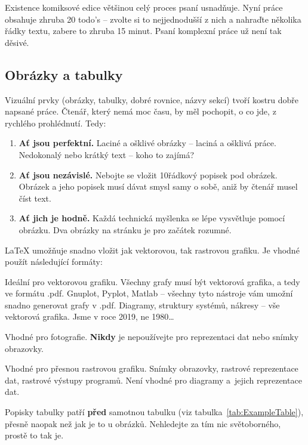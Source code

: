 Existence komiksové edice většinou celý proces psaní usnadňuje. Nyní práce obsahuje zhruba 20 todo's -- zvolte si to nejjednodušší z nich a nahraďte několika řádky textu, zabere to zhruba 15 minut. Psaní komplexní práce už není tak děsivé.

\subsection{Obrázky a tabulky}
\label{sec:Images}

Vizuální prvky (obrázky, tabulky, dobré rovnice, názvy sekcí) tvoří kostru dobře napsané práce. Čtenář, který nemá moc času, by měl pochopit, o co jde, z rychlého prohlédnutí.  
Tedy:
\begin{enumerate}[noitemsep]
\item \textbf{Ať jsou perfektní.} Laciné a ošklivé obrázky -- laciná a ošklivá práce. Nedokonalý nebo krátký text -- koho to zajímá?
\item \textbf{Ať jsou nezávislé.} Nebojte se vložit 10řádkový popisek pod obrázek. Obrázek a jeho popisek musí dávat smysl samy o sobě, aniž by čtenář musel číst text.
\item \textbf{Ať jich je hodně.} Každá technická myšlenka se lépe vysvětluje pomocí obrázku. Dva obrázky na stránku je pro začátek rozumné.
\end{enumerate}
\LaTeX{} umožňuje snadno vložit jak vektorovou, tak rastrovou grafiku. Je vhodné použít následující formáty:
\begin{description}[noitemsep]
\item[.pdf] Ideální pro vektorovou grafiku. Všechny grafy musí být vektorová grafika, a tedy ve formátu .pdf. Gnuplot, Pyplot, Matlab -- všechny tyto nástroje vám umožní snadno generovat grafy v .pdf. Diagramy, struktury systémů, nákresy -- vše vektorová grafika. Jsme v roce 2019, ne 1980\ldots
\item[.jpg] Vhodné pro fotografie. \textbf{Nikdy} je nepoužívejte pro reprezentaci dat nebo snímky obrazovky.
\item[.png] Vhodné pro přesnou rastrovou grafiku. Snímky obrazovky, rastrové reprezentace dat, rastrové výstupy programů. Není vhodné pro diagramy a~jejich reprezentace dat.
\end{description}
Popisky tabulky patří \textbf{před} samotnou tabulku (viz tabulka~\ref{tab:ExampleTable}), přesně naopak než jak je to u obrázků. Nehledejte za tím nic světoborného, prostě to tak je.


